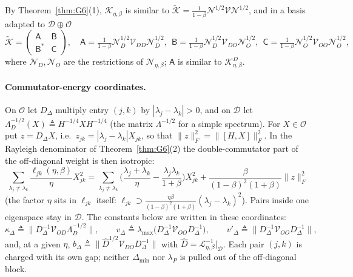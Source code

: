 \documentclass[11pt]{article}
\theoremstyle{remark}
\begin{document}
By Theorem~\ref{thm:G6}(1), $\mathcal K_{\eta,\beta}$ is similar to $\widetilde{\mathcal K}=\frac1{1-\beta}\mathcal N^{1/2}\mathcal V\mathcal N^{1/2}$, and in a basis adapted to $\mathcal D\oplus\mathcal O$
\begin{equation}\label{eq:diag-blocks}
\widetilde{\mathcal K}=\begin{pmatrix}\mathsf A&\mathsf B\\\mathsf B^{*}&\mathsf C\end{pmatrix},\quad
\mathsf A=\tfrac1{1-\beta}\mathcal N_D^{1/2}\mathcal V_{DD}\mathcal N_D^{1/2},\ \
\mathsf B=\tfrac1{1-\beta}\mathcal N_D^{1/2}\mathcal V_{DO}\mathcal N_O^{1/2},\ \
\mathsf C=\tfrac1{1-\beta}\mathcal N_O^{1/2}\mathcal V_{OO}\mathcal N_O^{1/2},
\end{equation}
where $\mathcal N_D,\mathcal N_O$ are the restrictions of $\mathcal N_{\eta,\beta}$; $\mathsf A$ is similar to $\mathcal K^D_{\eta,\beta}$.

\paragraph{Commutator-energy coordinates.} On $\mathcal O$ let $D_\Delta$ multiply entry $(j,k)$ by $|\lambda_j-\lambda_k|>0$, and on $\mathcal D$ let $\Lambda_D^{-1/2}(X)\triangleq H^{-1/4}XH^{-1/4}$ (the matrix $\Lambda^{-1/2}$ for a simple spectrum). For $X\in\mathcal O$ put $z=D_\Delta X$, i.e.\ $z_{jk}=|\lambda_j-\lambda_k|X_{jk}$, so that $\|z\|_F^2=\|[H,X]\|_F^2$. In the Rayleigh denominator of Theorem~\ref{thm:G6}(2) the double-commutator part of the off-diagonal weight is then isotropic:
\[
\sum_{\lambda_j\ne\lambda_k}\frac{\ell_{jk}(\eta,\beta)}{\eta}X_{jk}^2=\sum_{\lambda_j\ne\lambda_k}\Big(\frac{\lambda_j+\lambda_k}{\eta}-\frac{\lambda_j\lambda_k}{1+\beta}\Big)X_{jk}^2+\frac{\beta}{(1-\beta)^2(1+\beta)}\|z\|_F^2
\]
(the factor $\eta$ sits in $\ell_{jk}$ itself: $\ell_{jk}\supset\frac{\eta\beta}{(1-\beta)^2(1+\beta)}(\lambda_j-\lambda_k)^2$). Pairs inside one eigenspace stay in $\mathcal D$. The constants below are written in these coordinates:
\begin{equation}\label{eq:diag-commcoef}
\kappa_\Delta\triangleq\big\|D_\Delta^{-1}\mathcal V_{OD}\Lambda_D^{-1/2}\big\|,\qquad v_\Delta\triangleq\lambda_{\max}\big(D_\Delta^{-1}\mathcal V_{OO}D_\Delta^{-1}\big),\qquad v'_\Delta\triangleq\big\|D_\Delta^{-1}\mathcal V_{OO}D_\Delta^{-1}\big\|,
\end{equation}
and, at a given $\eta$, $b_\Delta\triangleq\|\widehat D^{1/2}\mathcal V_{DO}D_\Delta^{-1}\|$ with $\widehat D=\mathcal L_{\eta,\beta}^{-1}|_{\mathcal D}$. Each pair $(j,k)$ is charged with its own gap; neither $\Delta_{\min}$ nor $\lambda_P$ is pulled out of the off-diagonal block.
\end{document}
